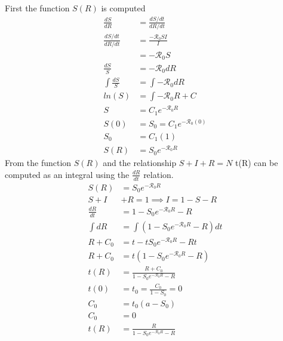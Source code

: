 First the function $S(R)$ is computed
\begin{align*}
    \frac{dS}{dR}       &= \frac{dS/dt}{dR/dt}\\
    \frac{dS/dt}{dR/dt} &= \frac{-{\mathcal R_0}SI}{I}\\
                        &= -{\mathcal R_0}S\\
    \frac{dS}{S}        &= -{\mathcal R_0}dR\\
    \int \frac{dS}{S}   &= \int -{\mathcal R_0}dR\\
    ln(S)               &= \int -{\mathcal R_0}R + C\\
    S                   &= C_1e^{-{\mathcal R_0}R}\\
    S(0)                &= S_0 = C_1e^{-{\mathcal R_0}(0)}\\
    S_0                 &= C_1(1)\\
    S(R)                &= S_0e^{-{\mathcal R_0}R}
\end{align*}
From the function $S(R)$ and the relationship $S+I+R=N$ t(R) can be computed as an integral using the $\frac{dR}{dt}$ relation.
\begin{align*}
    S(R) &= S_0e^{-{\mathcal R_0}R}\\
    S + I& + R = 1 \implies I = 1 - S - R\\
    \frac{dR}{dt} &= 1 - S_0e^{-{\mathcal R_0}R} - R\\
    \int dR &= \int (1 - S_0e^{-{\mathcal R_0}R} - R) dt\\
    R + C_0 &= t - tS_0e^{-{\mathcal R_0}R} - Rt\\
    R + C_0 &= t(1 - S_0e^{-{\mathcal R_0}R} - R)\\
    t(R)  &= \frac{R + C_0}{1 - S_0e^{-{\mathcal R_0}R} - R}\\
    t(0)  &= t_0 = \frac{C_0}{1 - S_0} = 0\\
    C_0   &= t_0(a-S_0)\\
    C_0   &= 0\\
    t(R)  &= \frac{R}{1 - S_0e^{-{\mathcal R_0}R} - R}
\end{align*}
